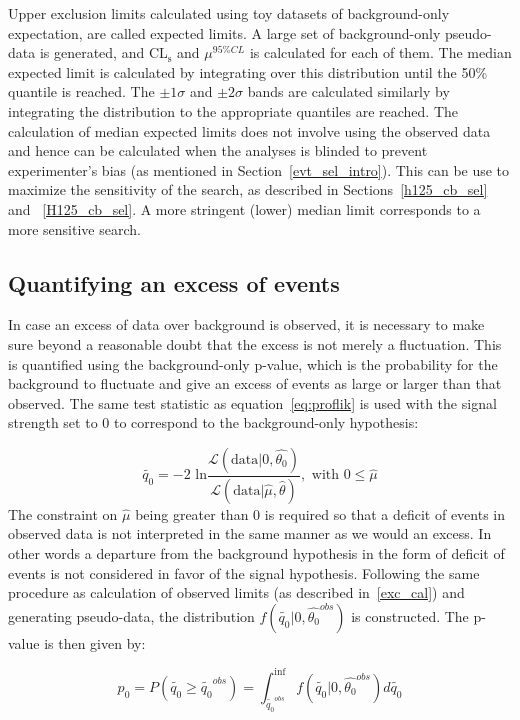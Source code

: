 Upper exclusion limits calculated using toy datasets of background-only expectation, are called expected limits. A large set of background-only pseudo-data is generated, and CL$_\text{s}$ and $\mu^{95\%CL}$ is calculated for each of them. The median expected limit is calculated by integrating over this distribution until the 50\% quantile is reached. The $\pm 1\sigma$ and $\pm 2\sigma$ bands are calculated similarly by integrating the distribution to the appropriate quantiles are reached. The calculation of median expected limits does not involve using the observed data and hence can be calculated when the analyses is blinded to prevent experimenter's bias (as mentioned in Section~\ref{evt_sel_intro}). This can be use to maximize the sensitivity of the search, as described in Sections~\ref{h125_cb_sel} and ~\ref{H125_cb_sel}. A more stringent (lower) median limit corresponds to a more sensitive search.  


\subsection{Quantifying an excess of events}
\label{theo_uncert}
In case an excess of data over background is observed, it is necessary to make sure beyond a reasonable doubt that the excess is not merely a fluctuation. This is quantified using the background-only p-value, which is the probability for the background to fluctuate and give an excess of events as large or larger than that observed. The same test statistic as equation~\ref{eq:proflik} is used with the signal strength set to 0 to correspond to the background-only hypothesis:

\begin{equation}
\label{eq:proflik_b}
  \tilde{q_0}=-2\text{ ln}\frac{\mathcal{L}(\text{data}|0,\hat{\theta_0})}{\mathcal{L}(\text{data}|\hat{\mu},\hat{\theta})},\text{   with  } 0\leq\hat{\mu} 
\end{equation}
The constraint on $\hat\mu$ being greater than 0 is required so that a deficit of events in observed data is not interpreted in the same manner as we would an excess. In other words a departure from the background hypothesis in the form of deficit of events is not considered in favor of the signal hypothesis. Following the same procedure as calculation of observed limits (as described in~\ref{exc_cal}) and generating pseudo-data, the distribution $f(\tilde{q_0}|0,\hat{\theta_{0}}^{obs})$ is constructed. The p-value is then given by:

\begin{equation}                                                                                                                          
  \label{eq:p0}                                                     
  p_0=P(\tilde{q_0}\geq \tilde{q_0}^{obs})=\int_{\tilde{q_0}^{obs}}^{\inf}f(\tilde{q_0}|0,\hat{\theta_0}^{obs})d\tilde{q_0}               \end{equation}

